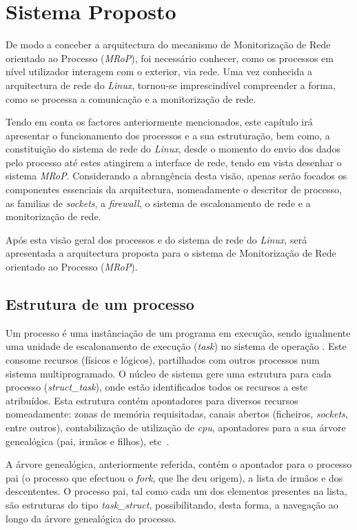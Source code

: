\chapter{Sistema Proposto}
\label{cap:Estrutura}

De modo a conceber a arquitectura do mecanismo de Monitorização de Rede orientado ao Processo (\textit{MRoP}), foi necessário conhecer, como os processos em nível utilizador interagem com o exterior, via rede.
Uma vez conhecida a arquitectura de rede do \textit{Linux}, tornou-se imprescindível compreender a forma, como se processa a comunicação e a monitorização de rede.

Tendo em conta os factores anteriormente mencionados, este capítulo irá apresentar o funcionamento dos processos e a sua estruturação, bem como, a constituição do sistema de rede do \textit{Linux}, desde o momento do envio dos dados pelo processo até estes atingirem a interface de rede, tendo em vista desenhar o sistema \textit{MRoP}.
Considerando a abrangência desta visão, apenas serão focados os componentes essenciais da arquitectura, nomeadamente o descritor de processo, as familias de \textit{sockets}, a \textit{firewall}, o sistema de escalonamento de rede e a monitorização de rede.

Após esta visão geral dos processos e do sistema de rede do \textit{Linux}, será apresentada a arquitectura proposta para o sistema de Monitorização de Rede orientado ao Processo (\textit{MRoP}).

\section{Estrutura de um processo}

Um processo é uma instânciação de um programa em execução, sendo igualmente uma unidade de escalonamento de execução (\textit{task}) no sistema de operação .
Este consome recursos (físicos e lógicos), partilhados com outros processos num sistema multiprogramado.
O núcleo de sistema gere uma estrutura para cada processo (\textit{struct\_task}), onde estão identificados todos os recursos a este atribuídos.
Esta estrutura contém apontadores para diversos recursos nomeadamente: zonas de memória requisitadas, canais abertos (ficheiros, \textit{sockets}, entre outros), contabilização de utilização de \textit{cpu}, apontadores para a sua árvore genealógica (pai, irmãos e filhos), etc~\cite{LKI, LKP}.

A árvore genealógica, anteriormente referida, contém o apontador para o processo pai (o processo que efectuou o \textit{fork}, que lhe deu origem), a lista de irmãos e dos descententes.
O processo pai, tal como cada um dos elementos presentes na lista, são estruturas do tipo \textit{task\_struct}, possibilitando, desta forma, a navegação ao longo da árvore genealógica do processo.

